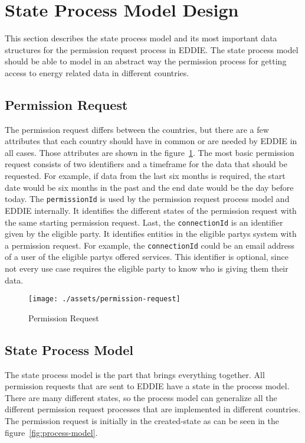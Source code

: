 \section{State Process Model Design}\label{sec:state-process-model-design}
This section describes the state process model and its most important data structures for the permission request process in EDDIE\@.
The state process model should be able to model in an abstract way the permission process for getting access to energy related data in different countries.

\subsection{Permission Request}\label{subsec:permission-request}
The permission request differs between the countries, but there are a few attributes that each country should have in common or are needed by EDDIE in all cases.
Those attributes are shown in the figure\ \ref{fig:permission-request}.
The most basic permission request consists of two identifiers and a timeframe for the data that should be requested.
For example, if data from the last six months is required, the start date would be six months in the past and the end date would be the day before today.
The \texttt{permissionId} is used by the permission request process model and EDDIE internally.
It identifies the different states of the permission request with the same starting permission request.
Last, the \texttt{connectionId} is an identifier given by the eligible party.
It identifies entities in the eligible partys system with a permission request.
For example, the \texttt{connectionId} could be an email address of a user of the eligible partys offered services.
This identifier is optional, since not every use case requires the eligible party to know who is giving them their data.


\begin{figure}[h]
    \texttt{[image: ./assets/permission-request]}
    \caption{Permission Request}
    \label{fig:permission-request}
\end{figure}

\subsection{State Process Model}\label{subsec:state-process-model}
The state process model is the part that brings everything together.
All permission requests that are sent to EDDIE have a state in the process model.
There are many different states, so the process model can generalize all the different permission request processes that are implemented in different countries.
The permission request is initially in the created-state as can be seen in the figure\ \ref{fig:process-model}.

